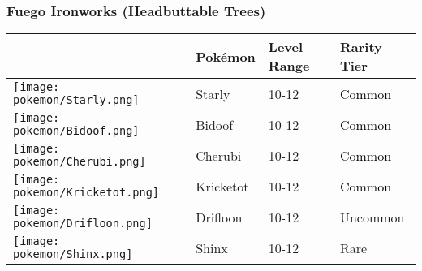 \subsubsection{Fuego Ironworks (Headbuttable Trees)}%
\label{ssubsec:FuegoIronworks(HeadbuttableTrees)}%
\begin{longtable}{||l l l l||}%
\hline%
\rowcolor{GroundColor}%
&Pokémon&Level Range&Rarity Tier\\%
\hline%
\endhead%
\hline%
\rowcolor{GroundColor}%
\texttt{[image: pokemon/Starly.png]}&Starly&10{-}12&\textcolor{black}{%
Common%
}\\%
\hline%
\rowcolor{GroundColor}%
\texttt{[image: pokemon/Bidoof.png]}&Bidoof&10{-}12&\textcolor{black}{%
Common%
}\\%
\hline%
\rowcolor{GroundColor}%
\texttt{[image: pokemon/Cherubi.png]}&Cherubi&10{-}12&\textcolor{black}{%
Common%
}\\%
\hline%
\rowcolor{GroundColor}%
\texttt{[image: pokemon/Kricketot.png]}&Kricketot&10{-}12&\textcolor{black}{%
Common%
}\\%
\hline%
\rowcolor{GroundColor}%
\texttt{[image: pokemon/Drifloon.png]}&Drifloon&10{-}12&\textcolor{OliveGreen}{%
Uncommon%
}\\%
\hline%
\rowcolor{GroundColor}%
\texttt{[image: pokemon/Shinx.png]}&Shinx&10{-}12&\textcolor{RedOrange}{%
Rare%
}\\%
\hline%
\end{longtable}%
\caption{Wild Pokémon in Fuego Ironworks (Headbuttable Trees)}